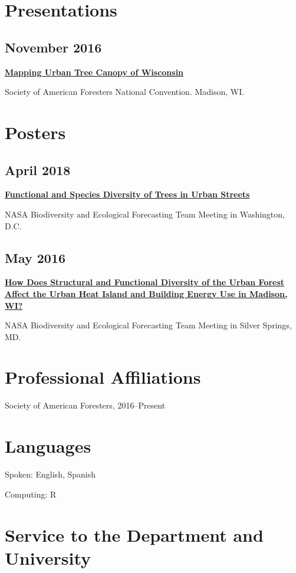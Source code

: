 \documentclass{article}
\begin{document}
\section*{Presentations}
\label{sec:org2414db4}
\subsection*{November 2016}
\label{sec:org8f5cf65}
\textbf{\href{http://pages.stat.wisc.edu/\~erker/Presentations/SAF\_20161105/saf\_presentation.html}{Mapping Urban Tree Canopy of Wisconsin}}

Society of American Foresters National Convention. Madison, WI.
\section*{Posters}
\label{sec:orged356a0}
\subsection*{April 2018}
\label{sec:orgb7402c9}
\textbf{\href{http://pages.stat.wisc.edu/\~erker/Posters/NASA\_poster\_2018.jpg}{Functional and Species Diversity of Trees in Urban Streets}}

NASA Biodiversity and Ecological Forecasting Team Meeting in
Washington, D.C.
\subsection*{May 2016}
\label{sec:org2433f31}
\textbf{\href{http://pages.stat.wisc.edu/\~erker/Posters/NASA\_poster\_2016.jp2}{How Does Structural and Functional Diversity of the Urban Forest
Affect the Urban Heat Island and Building Energy Use in Madison, WI?}}

NASA Biodiversity and Ecological Forecasting Team Meeting in Silver Springs, MD.
\section*{Professional Affiliations}
\label{sec:org293db5e}
Society of American Foresters, 2016--Present

\section*{Languages}
\label{sec:org0a872ac}
Spoken: English, Spanish

Computing: R

\section*{Service to the Department and University}
\label{sec:orgf3d3c22}
\end{document}
